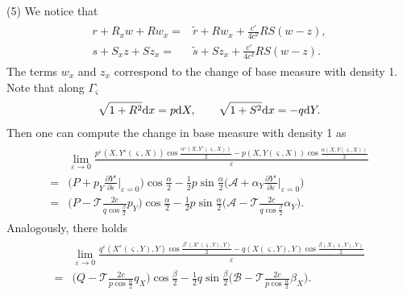 \documentclass[11pt,reqno]{article}
\newcommand{\eps}{\varepsilon}
\newcommand{\fr}{\frac}
\newcommand{\pa}{\partial}
\numberwithin{equation}{section}
\begin{document}
(5) We notice that
\begin{align*}
\begin{split}
r+R_xw+Rw_x=&\tilde{r} +Rw_x+\fr{c'}{4c^2}RS(w-z),\\
s+S_xz+Sz_x=&\tilde{s} +Sz_x+\fr{c'}{4c^2}RS(w-z).
\end{split}
\end{align*}
The terms $w_x$ and $z_x$ correspond to the change of base measure with density 1.
Note that along $\Gamma_\varsigma$
\begin{align}\label{7.9}
\sqrt{1+R^2}{\rm d} x=p{\rm d} X,\qquad \sqrt{1+S^2}{\rm d} x=-q{\rm d} Y.
\end{align}
Then one can compute the change in base measure with density 1 as
\begin{align}\label{7.10}
\begin{split}
&\lim_{\eps\rightarrow0}\fr{p^\eps(X,Y^\eps(\varsigma, X))\cos\fr{\alpha^\eps(X,Y^\eps(\varsigma, X))}{2}-p(X,Y(\varsigma, X))\cos\fr{\alpha(X,Y(\varsigma, X))}{2}}{\eps} \\
=&\Big(P+p_Y\fr{\pa Y^\eps}{\pa \eps}\Big|_{\eps=0}\Big)\cos\fr{\alpha}{2} -\fr{1}{2}p\sin\fr{\alpha}{2}\Big(\mathcal{A}+\alpha_Y\fr{\pa Y^\eps}{\pa \eps}\Big|_{\eps=0}\Big) \\
=&\Big(P-\mathcal{T}\fr{2c}{q\cos\fr{\beta}{2}}p_Y\Big)\cos\fr{\alpha}{2} -\fr{1}{2}p\sin\fr{\alpha}{2}\Big(\mathcal{A}-\mathcal{T}\fr{2c}{q\cos\fr{\beta}{2}}\alpha_Y\Big).
\end{split}
\end{align}
Analogously, there holds
\begin{align}\label{7.11}
\begin{split}
&\lim_{\eps\rightarrow0}\fr{q^\eps(X^\eps(\varsigma, Y),Y)\cos\fr{\beta^\eps(X^\eps(\varsigma, Y),Y)}{2}-q(X(\varsigma, Y),Y)\cos\fr{\beta(X(\varsigma, Y),Y)}{2}}{\eps} \\
=&\Big(Q-\mathcal{T}\fr{2c}{p\cos\fr{\alpha}{2}}q_X\Big)\cos\fr{\beta}{2} -\fr{1}{2}q\sin\fr{\beta}{2}\Big(\mathcal{B}-\mathcal{T}\fr{2c}{p\cos\fr{\alpha}{2}}\beta_X\Big).
\end{split}
\end{align}
\end{document}
